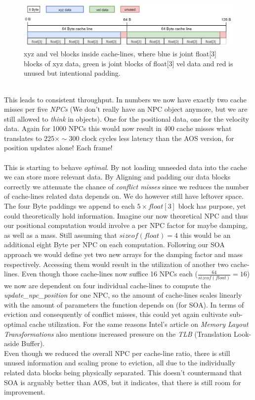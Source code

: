 \begin{figure}[!htbp]
	\centering
	\includegraphics[width=1.0\linewidth, height=0.17\linewidth]{PICs/CacheUtilizationNPCSOA}
	\caption{xyz and vel blocks inside cache-lines, where blue is joint float[3] blocks of xyz data, green is joint blocks of float[3] vel data and red is unused but intentional padding.}\label{cache_utilization_soa}
\end{figure}
\\This leads to consistent throughput. In numbers we now have exactly two cache misses per five \textit{NPCs} (We don't really have an NPC object anymore, but we are still allowed to \textit{think} in objects). One for the positional data, one for the velocity data. Again for 1000 NPCs this would now result in 400 cache misses what translates to $225\times\sim300$ clock cycles less latency than the AOS version, for position updates alone! Each frame!\\\\
This is starting to behave \textit{optimal}. By not loading unneeded data into the cache we can store more relevant data. By Aligning and padding our data blocks correctly we attenuate the chance of \textit{conflict misses} since we reduces the number of cache-lines related data depends on. We do however still have leftover space. The four Byte paddings we append to each $5\times float[3]$ block has purpose, yet could theoretically hold information. Imagine our now theoretical NPC and thus our positional computation would involve a per NPC factor for maybe damping, as well as a mass. Still assuming that $sizeof(float) = 4$ this would be an additional eight Byte per NPC on each computation. Following our SOA approach we would define yet two new arrays for the damping factor and mass respectively. Accessing them would result in the utilization of another two cache-lines. Even though those cache-lines now suffice 16 NPCs each ($\frac{64}{sizeof(float)} = 16$) we now are dependent on four individual cache-lines to compute the \textit{update\_npc\_position} for one NPC, so the amount of cache-lines scales linearly with the amount of parameters the function depends on (for SOA). In terms of eviction and consequently of conflict misses, this could yet again cultivate sub-optimal cache utilization. For the same reasons Intel's article on \textit{Memory Layout Transformations} also mentions increased pressure on the \textit{TLB} (Translation Look-aside Buffer).\\
Even though we reduced the overall NPC per cache-line ratio, there is still unused information and scaling prone to eviction, all due to the individually related data blocks being physically separated. This doesn't countermand that SOA is arguably better than AOS, but it indicates, that there is still room for improvement.

